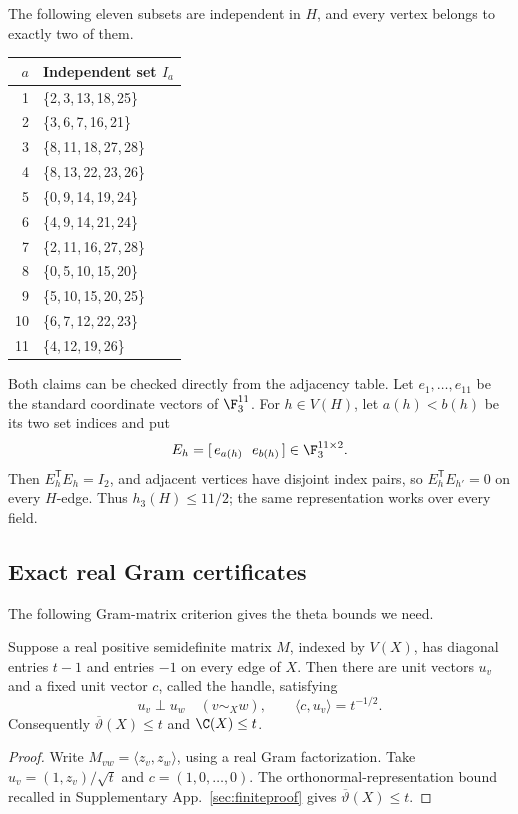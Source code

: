 The following eleven subsets are independent in \(H\), and every vertex
belongs to exactly two of them.
\begin{center}
\begin{tabular}{r@{\quad}l}
\toprule
\(a\)&Independent set \(I_a\)\\
\midrule
1&\{2,\,3,\,13,\,18,\,25\}\\
2&\{3,\,6,\,7,\,16,\,21\}\\
3&\{8,\,11,\,18,\,27,\,28\}\\
4&\{8,\,13,\,22,\,23,\,26\}\\
5&\{0,\,9,\,14,\,19,\,24\}\\
6&\{4,\,9,\,14,\,21,\,24\}\\
7&\{2,\,11,\,16,\,27,\,28\}\\
8&\{0,\,5,\,10,\,15,\,20\}\\
9&\{5,\,10,\,15,\,20,\,25\}\\
10&\{6,\,7,\,12,\,22,\,23\}\\
11&\{4,\,12,\,19,\,26\}\\
\bottomrule
\end{tabular}
\end{center}
Both claims can be checked directly from the adjacency table.
Let $e_1,\ldots,e_{11}$ be the standard coordinate vectors of $\F_3^{11}$.
For \(h\in V(H)\), let \(a(h)<b(h)\) be its two set indices and put
\[
 E_h=[\,e_{a(h)}\ \ e_{b(h)}\,]\in\F_3^{11\times2}.
\]
Then \(E_h^{\mathsf T}E_h=I_2\), and adjacent vertices have disjoint
index pairs, so \(E_h^{\mathsf T}E_{h'}=0\) on every \(H\)-edge.
Thus $h_3(H)\le11/2$; the same representation works over every field.

\subsection{Exact real Gram certificates}\label{subsix:sec:gram}

The following Gram-matrix criterion gives the theta bounds we need.
\begin{lemma}\label{subsix:lem:gram}
Suppose a real positive semidefinite matrix \(M\), indexed by \(V(X)\),
has diagonal entries \(t-1\) and entries \(-1\) on every edge of \(X\).
Then there are unit vectors \(u_v\) and a fixed unit vector \(c\),
called the handle, satisfying
\[
 u_v\perp u_w\quad(v\sim_Xw),\qquad
 \langle c,u_v\rangle=t^{-1/2}.
\]
Consequently $\overline\vartheta(X)\le t$ and $\C(X)\le t$.
\end{lemma}
\begin{proof}
Write \(M_{vw}=\langle z_v,z_w\rangle\), using a real Gram factorization.
Take \(u_v=(1,z_v)/\sqrt t\) and \(c=(1,0,\ldots,0)\).
The orthonormal-representation bound recalled in Supplementary
App.~\ref{sec:finiteproof} gives $\overline\vartheta(X)\le t$.
\end{proof}


